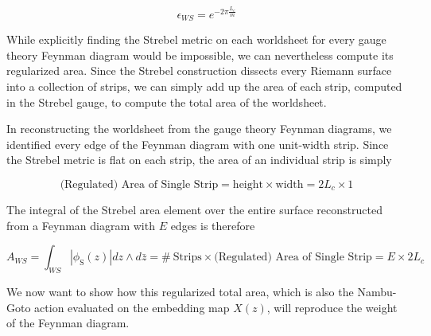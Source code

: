 \documentclass[english]{article}
\renewcommand{\>}{\rangle}
\newcommand{\<}{\langle}
\renewcommand{\(}{\left(}
\renewcommand{\)}{\right)}
\begin{document}
\begin{equation} \label{eq:epsilonWS}
    \epsilon_{WS} = e^{-2 \pi \frac{L_{c}}{m}}
\end{equation}

While explicitly finding the Strebel metric on each worldsheet for every gauge theory Feynman diagram would be impossible, we can nevertheless compute its regularized area. Since the Strebel construction dissects every Riemann surface into a collection of strips, we can simply add up the area of each strip, computed in the Strebel gauge,  to compute the total area of the worldsheet. 

In reconstructing the worldsheet from the gauge theory Feynman diagrams, we identified every edge of the Feynman diagram with one unit-width strip. Since the Strebel metric is flat on each strip, the area of an individual strip is simply

\begin{equation}
    \text{(Regulated) Area of Single Strip} = \text{height} \times \text{width}= 2 L_{c} \times 1
\end{equation}

The integral of the Strebel area element over the entire surface reconstructed from a Feynman diagram with $E$ edges is therefore 

\begin{equation}
 A_{WS} = \int_{WS} |\phi_{\text{S}}(z)| dz \wedge d\bar{z} = \# \ \text{Strips} \times   \text{(Regulated) Area of Single Strip} = E \times 2L_{c}
\end{equation}

We now want to show how this regularized total area, which is also the Nambu-Goto action evaluated on the embedding map $X(z)$, will reproduce the weight of the Feynman diagram. 
\end{document}
